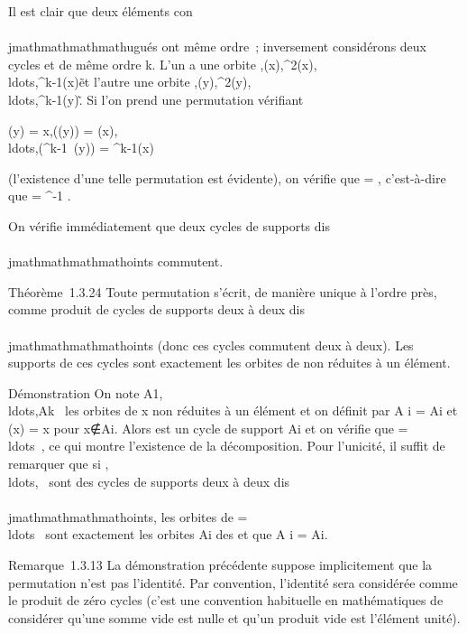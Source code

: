 Il est clair que deux éléments con\\\\jmathmathmathmathugués ont même ordre~; inversement
considérons deux cycles  et  de même ordre k.
L'un a une orbite
\x,(x),^2(x),
\\ldots,^k-1(x)\~
et l'autre une orbite
\y,(y),^2(y),
\\ldots,^k-1(y)\~.
Si l'on prend une permutation \tau vérifiant

\tau(y) = x,\tau((y)) =
(x),\\ldots,\tau(^k-1~(y))
= ^k-1(x)

(l'existence d'une telle permutation est évidente), on vérifie que \tau \cdot
{} =  \cdot \tau, c'est-à-dire que  =
\tau^-1 \cdot {} \cdot \tau.

On vérifie immédiatement que deux cycles de supports dis\\\\jmathmathmathmathoints
commutent.

Théorème~1.3.24 Toute permutation \sigma s'écrit, de manière unique à l'ordre
près, comme produit de cycles de supports deux à deux dis\\\\jmathmathmathmathoints (donc
ces cycles commutent deux à deux). Les supports de ces cycles sont
exactement les orbites de \sigma non réduites à un élément.

Démonstration On note
A1,\\ldots,Ak~
les orbites de x non réduites à un élément et on définit \sigmai
par \sigmai\textbar{}A i =
\sigma\textbar{}Ai et \sigmai(x) = x pour
x∉Ai. Alors \sigmai est un
cycle de support Ai et on vérifie que \sigma =
\\ldots\sigmak~,
ce qui montre l'existence de la décomposition. Pour l'unicité, il suffit
de remarquer que si
,\\ldots,\sigmak~
sont des cycles de supports deux à deux dis\\\\jmathmathmathmathoints, les orbites de \sigma =
\\ldots\sigmak~
sont exactement les orbites Ai des \sigmai et que
\sigmai\textbar{}A i =
\sigma\textbar{}Ai.

Remarque~1.3.13 La démonstration précédente suppose implicitement que la
permutation n'est pas l'identité. Par convention, l'identité sera
considérée comme le produit de zéro cycles (c'est une convention
habituelle en mathématiques de considérer qu'une somme vide est nulle et
qu'un produit vide est l'élément unité).


